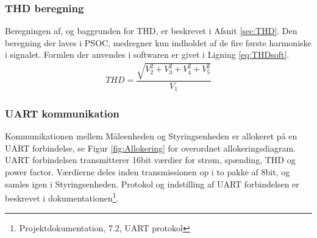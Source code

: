 
\subsubsection{THD beregning}
Beregningen af, og baggrunden for THD, er beskrevet i Afsnit \ref{sec:THD}. Den beregning der laves i PSOC, medregner kun indholdet af de fire første harmoniske i signalet. Formlen der anvendes i softwaren er givet i Ligning \ref{eq:THDsoft}.
\begin{align}
\label{eq:THDsoft}
THD = \dfrac{\sqrt{V_2^{2}+V_3^{2}+V_4^{2}+V_5^{2}}}{V_{1}}
\end{align}
 

\subsubsection{UART kommunikation}
Kommunikationen mellem Måleenheden og Styringsenheden er allokeret på en UART forbindelse, se Figur \ref{fig:Allokering} for overordnet allokeringsdiagram. UART forbindelsen transmitterer 16bit værdier for strøm, spænding, THD og power factor. Værdierne deles inden transmissionen op i to pakke af 8bit, og samles igen i Styringsenheden. Protokol og indstilling af UART forbindelsen er beskrevet i dokumentationen\footnote{Projektdokumentation, 7.2, UART protokol}.




